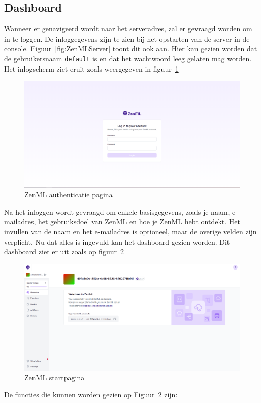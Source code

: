 \subsection{Dashboard}
Wanneer er genavigeerd wordt naar het serveradres, zal er gevraagd worden om in te loggen. De inloggegevens zijn te zien bij het opstarten van de server in de console. Figuur~\ref{fig:ZenMLServer} toont dit ook aan. Hier kan gezien worden dat de gebruikersnaam \texttt{default} is en dat het wachtwoord leeg gelaten mag worden. Het inlogscherm ziet eruit zoals weergegeven in figuur~\ref{fig:ZenML_Login}
\begin{figure}[h]
    \centering
    \includegraphics[width=0.9\linewidth]{graphics/ZenML_Login.PNG}
    \caption{ZenML authenticatie pagina}
    \label{fig:ZenML_Login}
\end{figure}
Na het inloggen wordt gevraagd om enkele basisgegevens, zoals je naam, e-mailadres, het gebruiksdoel van ZenML en hoe je ZenML hebt ontdekt. Het invullen van de naam en het e-mailadres is optioneel, maar de overige velden zijn verplicht.
Nu dat alles is ingevuld kan het dashboard gezien worden. Dit dashboard ziet er uit zoals op figuur~\ref{fig:ZenML_Overview}
\begin{figure}[h]
    \centering
    \includegraphics[width=0.9\linewidth]{graphics/ZenML_Overview.PNG}
    \caption{ZenML startpagina}
    \label{fig:ZenML_Overview}
\end{figure}
De functies die kunnen worden gezien op Figuur~\ref{fig:ZenML_Overview} zijn:

